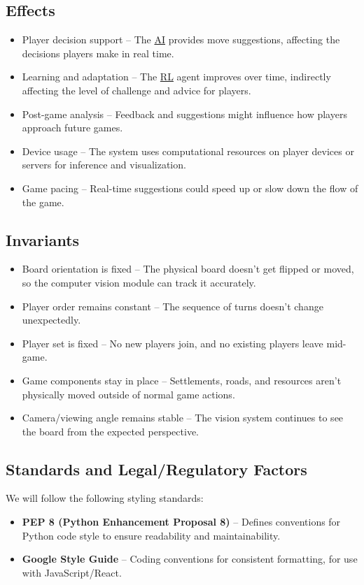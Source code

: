 \documentclass{article}
\newcommand{\AI}{\href{https://en.wikipedia.org/wiki/Artificial_intelligence}{AI}}
\newcommand{\RL}{\href{https://www.ibm.com/think/topics/reinforcement-learning}{RL}}
\begin{document}
\subsection{Effects}\label{subsec:effects}
\begin{itemize}
    \item {Player decision support} – The \AI{} provides move suggestions, affecting the decisions players make in real time.
    \item {Learning and adaptation} – The \RL{} agent improves over time, indirectly affecting the level of challenge and advice for players.
    \item {Post-game analysis} – Feedback and suggestions might influence how players approach future games.
    \item {Device usage} – The system uses computational resources on player devices or servers for inference and visualization.
    \item {Game pacing} – Real-time suggestions could speed up or slow down the flow of the game.
\end{itemize}

\subsection{Invariants}\label{subsec:invariants}
\begin{itemize}
    \item {Board orientation is fixed} – The physical board doesn’t get flipped or moved, so the computer vision module can track it accurately.
    \item {Player order remains constant} – The sequence of turns doesn’t change unexpectedly.
    \item {Player set is fixed} – No new players join, and no existing players leave mid-game.
    \item {Game components stay in place} – Settlements, roads, and resources aren’t physically moved outside of normal game actions.
    \item {Camera/viewing angle remains stable} – The vision system continues to see the board from the expected perspective.
\end{itemize}

\subsection{Standards and Legal/Regulatory Factors}
We will follow the following styling standards:
\begin{itemize}
    \item \textbf{PEP 8 (Python Enhancement Proposal 8)} – Defines conventions for Python code style to ensure readability and maintainability.
    \item \textbf{Google Style Guide} – Coding conventions for consistent formatting, for use with JavaScript/React.
\end{itemize}
\end{document}
